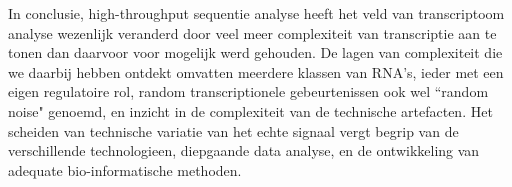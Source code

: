 In conclusie, high-throughput sequentie analyse heeft het veld van transcriptoom analyse wezenlijk veranderd door veel meer complexiteit van transcriptie aan te tonen dan daarvoor voor mogelijk werd gehouden. De lagen van complexiteit die we daarbij hebben ontdekt omvatten meerdere klassen van RNA's, ieder met een eigen regulatoire rol, random transcriptionele gebeurtenissen ook wel ``random noise" genoemd, en inzicht in de complexiteit van de technische artefacten. Het scheiden van technische variatie van het echte signaal vergt begrip van de verschillende technologieen, diepgaande data analyse, en de ontwikkeling van adequate bio-informatische methoden.
